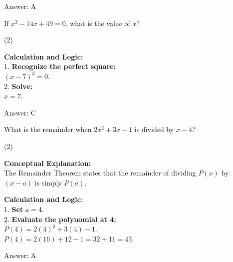 \documentclass[11pt,paper=a4,answers]{exam}
\begin{document}
\begin{questions}
\begin{solution}
\vspace{30pt}

Answer: \colorbox{yellow!100}{A}
\end{solution}

\vspace{60pt}

\question
If $x^2 - 14x + 49 = 0$, what is the value of $x$?
\begin{tasks}(2)
\end{tasks}

\begin{solution}
\textbf{Calculation and Logic:} \\
1. \textbf{Recognize the perfect square:} \\
$(x-7)^2 = 0$. \\
2. \textbf{Solve:} \\
$x = 7$.

\vspace{30pt}

Answer: \colorbox{yellow!100}{C}
\end{solution}

\vspace{60pt}

\question
What is the remainder when $2x^2 + 3x - 1$ is divided by $x - 4$?
\begin{tasks}(2)
\end{tasks}

\begin{solution}
\textbf{Conceptual Explanation:} \\
The Remainder Theorem states that the remainder of dividing $P(x)$ by $(x-a)$ is simply $P(a)$.

\vspace{30pt}

\textbf{Calculation and Logic:} \\
1. \textbf{Set } $a = 4$. \\
2. \textbf{Evaluate the polynomial at 4:} \\
$P(4) = 2(4)^2 + 3(4) - 1$. \\
$P(4) = 2(16) + 12 - 1 = 32 + 11 = 43$.

\vspace{30pt}

Answer: \colorbox{yellow!100}{A}
\end{solution}


\end{questions}
\end{document}
